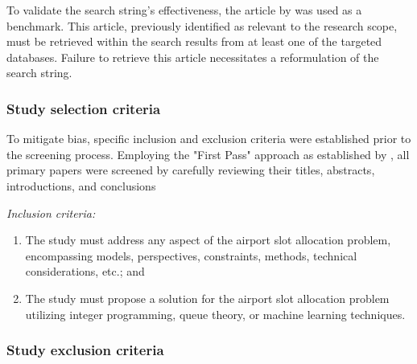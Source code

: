 To validate the search string's effectiveness, the article by  was used as a benchmark. This article, previously identified as relevant to the research scope, must be retrieved within the search results from at least one of the targeted databases. Failure to retrieve this article necessitates a reformulation of the search string.

\subsubsection{Study selection criteria}
To mitigate bias, specific inclusion and exclusion criteria were established prior to the screening process. Employing the "First Pass" approach as established by , all primary papers were screened by carefully reviewing their titles, abstracts, introductions, and conclusions

\noindent \textit{Inclusion criteria:}

\begin{enumerate}

    \item The study must address any aspect of the airport slot allocation problem, encompassing models, perspectives, constraints, methods, technical considerations, etc.; and
    \item The study must propose a solution for the airport slot allocation problem utilizing integer programming, queue theory, or machine learning techniques.
\end{enumerate}

\subsubsection{Study exclusion criteria}


